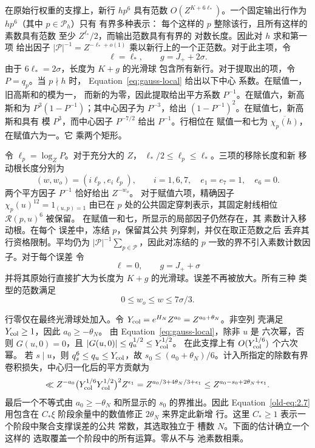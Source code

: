 \documentclass[11pt,a4paper]{article}
\numberwithin{equation}{section}
\numberwithin{figure}{section}
\theoremstyle{definition}
\theoremstyle{remark}
\begin{document}
在原始行权重的支撑上，新行 \(hp^6\)
具有范数 \(O(Z^{K+6\ell_*})\)。一个固定输出行作为 \(hp^6\)（其中 \(p\in\mathcal P_h\)）只有
有界多种表示：
每个这样的 \(p\) 整除该行，且所有这样的素数具有范数
至少 \(Z^{\ell_*}/2\)，而输出范数具有有界的
对数长度。因此对 \(h\) 求和第一项
给出因子 \(|\mathcal P|^{-1}=Z^{-\ell_*+o(1)}\)
乘以新行上的一个正范数。对于此主项，令
\[
 \ell=\ell_*,\qquad g=J_++2\sigma.
\]
由于 \(6\ell_*=2\sigma\)，长度为 \(K+g\) 的光滑球
包含所有新行。对于提取出的项，令 \(P=q_p\)。当 \(p\nmid h\) 时，
Equation~\eqref{eq:gauss-local} 给出以下中心
系数。在赋值一，旧高斯和的模为一，
而新的为零，因此提取给出平方系数
\(P^{-1}\)。在赋值六，新高斯和为
\(P^3(1-P^{-1})\)；其中心因子为 \(P^{-3}\)，给出
\((1-P^{-1})^2\)。在赋值七，新高斯和具有
模 \(P^3\)，而中心因子 \(P^{-7/2}\) 给出
\(P^{-1}\)。行相位在
赋值一和七为 \(\overline{\chi_p(h)}\)，在赋值六为一。它
乘两个矩形。

令 \(\ell_p=\log_ZP\)。对于充分大的 \(Z\)，
\(\ell_*/2\le\ell_p\le\ell_*\)。三项的移除长度和新
移动根长度分别为
\begin{equation}
 (w,w_o)=(i\ell_p,e_i\ell_p),\qquad
 i=1,6,7,\quad e_1=e_7=1,\quad e_6=0.
 \label{old-eq:2.9}
\end{equation}
两个平方因子 \(P^{-1}\) 恰好给出 \(Z^{-w_o}\)。
对于赋值六项，精确因子
\(\chi_p(u)^{12}=1_{(u,p)=1}\) 由已在
\(p\) 处的公共固定穿刺表示，其固定射线相位 \(\mathcal R(p,u)^6\) 被保留。
在赋值一和七，所显示的局部因子仍然存在，其
素数计入移动根。在每个
误差中，冻结 \(p\)，保留其公共
列穿刺，并仅在取正范数之后
丢弃其行资格限制。平均仍为
\(|\mathcal P|^{-1}\sum_{p\in\mathcal P}\)，因此对冻结的 \(p\) 一致的界不引入素数计数因子。对于每个误差
令
\[
 \ell=0,\qquad g=J_++\sigma
\]
并将其原始行直接扩大为长度为
\(K+g\) 的光滑球。误差不再被放大。所有三种
类型的范数满足
\begin{equation}
 0\le w_o\le w\le7\sigma/3.
 \label{old-eq:2.10}
\end{equation}

行零仅在最终光滑球处加入。令
\(Y_{\rm col}=e^{H_N}Z^{a_0}=Z^{a_0+\theta_N}\)。非空列
壳满足 \(Y_{\rm col}\ge1\)，因此 \(a_0\ge-\theta_N\)。
由 Equation~\eqref{eq:gauss-local}，除非 \(u\) 是
六次幂，否则 \(G(u,0)=0\)，且 \(|G(u,0)|\le q_u^{1/2}\le Y_{\rm col}^{1/2}\)。
在此支撑上有 \(O(Y_{\rm col}^{1/6})\) 个六次幂。
若 \(s\mid u\)，则 \(q_s^6\le q_u\le Y_{\rm col}\)，故
\(s_0\le(a_0+\theta_N)/6\)。计入所指定的除数有界
卷积损失，中心归一化后的平方贡献为
\[
 \ll Z^{-a_0}\bigl(Y_{\rm col}^{1/6}Y_{\rm col}^{1/2}\bigr)^2
          Z^{\epsilon_1}
 =Z^{a_0/3+4\theta_N/3+\epsilon_1}
 \le Z^{a_0-s_0+2\theta_N+\epsilon_1}.
\]
最后一个不等式由 \(a_0\ge-\theta_N\) 和所显示的
\(s_0\) 的界推出。因此 Equation~\eqref{old-eq:2.7} 用包含在
\(C_*\xi\) 阶段余量中的数值修正 \(2\theta_N\) 来界定此新增
行。这里 \(C_*\ge1\) 表示一个阶段中聚合支撑误差的公共
常数，其选取独立于
槽数 \(N\)。下面的估计确立一个这样的
选取覆盖一个阶段中的所有运算。零从不与
池素数相乘。
\end{document}
